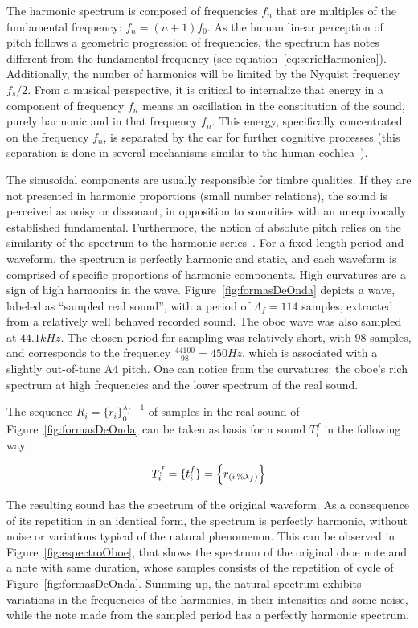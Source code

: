 The harmonic spectrum is composed of frequencies $f_n$ that are multiples of the fundamental frequency: $f_n=(n+1)f_0$. As the human linear perception of pitch follows  a geometric progression of frequencies, the spectrum has notes different from the fundamental frequency (see equation~\ref{eq:serieHarmonica}). Additionally, the number of harmonics will be limited by the Nyquist frequency $f_s/2$. From a musical perspective, it is critical to internalize that energy in a component of frequency $f_n$ means an oscillation in the constitution of the sound, purely harmonic and in that frequency $f_n$. This energy, specifically concentrated on the frequency $f_n$, is separated by the ear for further cognitive processes (this separation is done in several mechanisms similar to the human cochlea~\cite{Roederer}).

The sinusoidal components are usually responsible for timbre qualities. If they are not presented in harmonic proportions (small number relations), the sound is perceived as noisy or dissonant, in opposition to sonorities with an unequivocally established fundamental. Furthermore, the notion of absolute pitch relies on the similarity of the spectrum to the harmonic series~\cite{Roederer}. For a fixed length period and waveform, the spectrum is perfectly harmonic and static, and each waveform is comprised of specific proportions of harmonic components. High  curvatures are a sign of high harmonics in the wave. Figure~\ref{fig:formasDeOnda} depicts a wave, labeled as ``sampled real sound'', with a period of $\Lambda_f=114$ samples, extracted from a relatively well behaved recorded sound. The oboe wave was also sampled at $44.1kHz$. The chosen period for sampling was relatively short, with $98$ samples, and corresponds to the frequency $\frac{44100}{98}=450Hz$, which is associated with a slightly out-of-tune A4 pitch. One can notice from the curvatures: the oboe's rich spectrum at high frequencies and the lower spectrum of the real sound.

The sequence $ R_i=\{ r_i \}_0^{\lambda_f-1}$ of samples in the real sound of Figure~\ref{fig:formasDeOnda} can be taken as basis for a sound $T_i^f$ in the following way: 

\begin{equation}\label{sampleandoFormaDeOnda}
     T^f_i=\{ t_i^f \}=\Bigl\{ r_{(i\,\%\lambda_{f})} \Bigr\}
\end{equation}

The resulting sound has the spectrum of the original waveform. As a consequence of its repetition in an identical form, the spectrum is perfectly harmonic, without noise or variations typical of the natural phenomenon. This can be observed in Figure~\ref{fig:espectroOboe}, that shows the spectrum of the original oboe note and a note with same duration, whose samples consists of the repetition of cycle of Figure~\ref{fig:formasDeOnda}. Summing up, the natural spectrum exhibits variations in the frequencies of the harmonics, in their intensities and some noise, while the note made from the sampled period has a perfectly harmonic spectrum.


